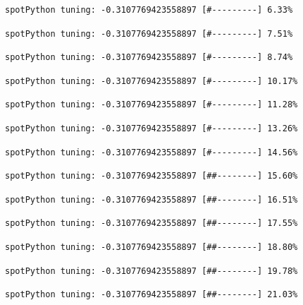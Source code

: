 \documentclass[
  letterpaper,
  DIV=11,
  numbers=noendperiod]{scrreprt}
\begin{document}
\begin{verbatim}
spotPython tuning: -0.3107769423558897 [#---------] 6.33% 
\end{verbatim}

\begin{verbatim}
spotPython tuning: -0.3107769423558897 [#---------] 7.51% 
\end{verbatim}

\begin{verbatim}
spotPython tuning: -0.3107769423558897 [#---------] 8.74% 
\end{verbatim}

\begin{verbatim}
spotPython tuning: -0.3107769423558897 [#---------] 10.17% 
\end{verbatim}

\begin{verbatim}
spotPython tuning: -0.3107769423558897 [#---------] 11.28% 
\end{verbatim}

\begin{verbatim}
spotPython tuning: -0.3107769423558897 [#---------] 13.26% 
\end{verbatim}

\begin{verbatim}
spotPython tuning: -0.3107769423558897 [#---------] 14.56% 
\end{verbatim}

\begin{verbatim}
spotPython tuning: -0.3107769423558897 [##--------] 15.60% 
\end{verbatim}

\begin{verbatim}
spotPython tuning: -0.3107769423558897 [##--------] 16.51% 
\end{verbatim}

\begin{verbatim}
spotPython tuning: -0.3107769423558897 [##--------] 17.55% 
\end{verbatim}

\begin{verbatim}
spotPython tuning: -0.3107769423558897 [##--------] 18.80% 
\end{verbatim}

\begin{verbatim}
spotPython tuning: -0.3107769423558897 [##--------] 19.78% 
\end{verbatim}

\begin{verbatim}
spotPython tuning: -0.3107769423558897 [##--------] 21.03% 
\end{verbatim}
\end{document}
